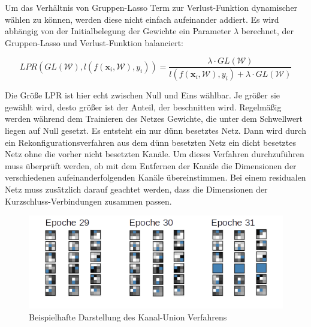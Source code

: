 Um das Verhältnis von Gruppen-Lasso Term zur Verlust-Funktion dynamischer wählen zu können, werden diese nicht einfach aufeinander addiert. Es wird abhängig von der Initialbelegung der Gewichte ein Parameter $\lambda$  berechnet, der Gruppen-Lasso und Verlust-Funktion balanciert:

\begin{equation}
 LPR\left(GL(\mathcal{W}),l(f(\mathbf{x}_i,\mathcal{W}),y_i)\right) = \frac{\lambda \cdot GL(\mathcal{W})}{l(f(\mathbf{x}_i,\mathcal{W}), y_i) + \lambda \cdot GL(\mathcal{W})}           
\end{equation}

Die Größe LPR ist hier echt zwischen Null und Eins wählbar. Je größer sie gewählt wird, desto größer ist der Anteil, der beschnitten wird. Regelmäßig werden während dem Trainieren des Netzes Gewichte, die unter dem Schwellwert liegen auf Null gesetzt. Es entsteht ein nur dünn besetztes Netz. Dann wird durch ein Rekonfigurationsverfahren aus dem dünn besetzten Netz ein dicht besetztes Netz ohne die vorher nicht besetzten Kanäle. Um dieses Verfahren durchzuführen muss überprüft werden, ob mit dem Entfernen der Kanäle die Dimensionen der verschiedenen aufeinanderfolgenden Kanäle übereinstimmen. Bei einem residualen Netz muss zusätzlich darauf geachtet werden, dass die Dimensionen der Kurzschluss-Verbindungen zusammen passen.

\begin{figure}[h]
 \centering
 \includegraphics[width=0.9 \textwidth]{KapitelPartA/images/union.png}
 \caption{Beispielhafte Darstellung des Kanal-Union Verfahrens}
 \label{abb:union}
\end{figure}



